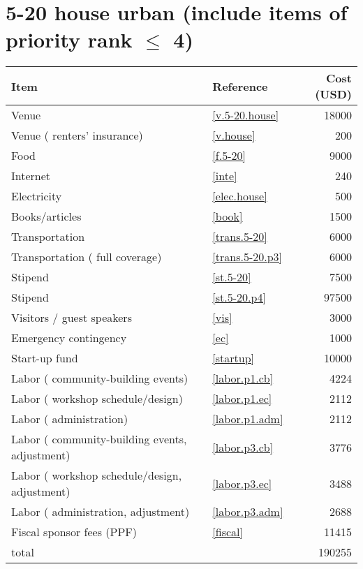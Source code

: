 \section*{5-20 house urban (include items of priority rank $\leq$ 4)}
\begin{center}
\begin{tabular}{llr}
Item & Reference & Cost (USD) \\ \hline
Venue & \ref{v.5-20.house} & 18000 \\
Venue ( renters' insurance) & \ref{v.house} & 200 \\
Food & \ref{f.5-20} & 9000 \\
Internet & \ref{inte} & 240 \\
Electricity & \ref{elec.house} & 500 \\
Books/articles & \ref{book} & 1500 \\
Transportation & \ref{trans.5-20} & 6000 \\
Transportation ( full coverage) & \ref{trans.5-20.p3} & 6000 \\
Stipend & \ref{st.5-20} & 7500 \\
Stipend & \ref{st.5-20.p4} & 97500 \\
Visitors / guest speakers & \ref{vis} & 3000 \\
Emergency contingency & \ref{ec} & 1000 \\
Start-up fund & \ref{startup} & 10000 \\
Labor ( community-building events) & \ref{labor.p1.cb} & 4224 \\
Labor ( workshop schedule/design) & \ref{labor.p1.ec} & 2112 \\
Labor ( administration) & \ref{labor.p1.adm} & 2112 \\
Labor ( community-building events, adjustment) & \ref{labor.p3.cb} & 3776 \\
Labor ( workshop schedule/design, adjustment) & \ref{labor.p3.ec} & 3488 \\
Labor ( administration, adjustment) & \ref{labor.p3.adm} & 2688 \\
Fiscal sponsor fees (PPF) & \ref{fiscal} & 11415 \\ \hline
total &  & 190255
\end{tabular}
\end{center}
\newpage
